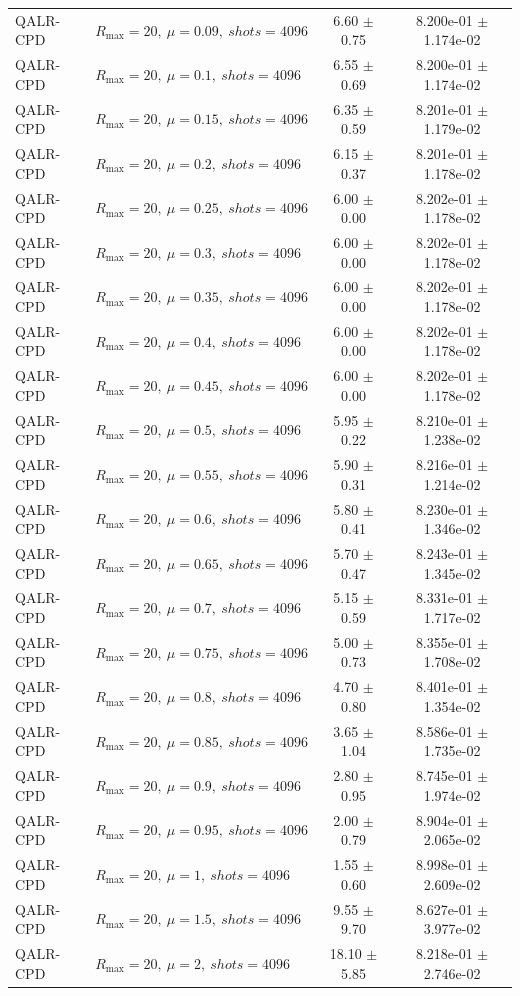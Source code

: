 \begin{table}[t]
\begin{tabular}{@{}llcc@{}}
QALR-CPD & \(R_{\max}=20,\ \mu=0.09,\ shots=4096\) & 6.60 $\pm$ 0.75 & 8.200e-01 $\pm$ 1.174e-02 \\
QALR-CPD & \(R_{\max}=20,\ \mu=0.1,\ shots=4096\) & 6.55 $\pm$ 0.69 & 8.200e-01 $\pm$ 1.174e-02 \\
QALR-CPD & \(R_{\max}=20,\ \mu=0.15,\ shots=4096\) & 6.35 $\pm$ 0.59 & 8.201e-01 $\pm$ 1.179e-02 \\
QALR-CPD & \(R_{\max}=20,\ \mu=0.2,\ shots=4096\) & 6.15 $\pm$ 0.37 & 8.201e-01 $\pm$ 1.178e-02 \\
QALR-CPD & \(R_{\max}=20,\ \mu=0.25,\ shots=4096\) & 6.00 $\pm$ 0.00 & 8.202e-01 $\pm$ 1.178e-02 \\
QALR-CPD & \(R_{\max}=20,\ \mu=0.3,\ shots=4096\) & 6.00 $\pm$ 0.00 & 8.202e-01 $\pm$ 1.178e-02 \\
QALR-CPD & \(R_{\max}=20,\ \mu=0.35,\ shots=4096\) & 6.00 $\pm$ 0.00 & 8.202e-01 $\pm$ 1.178e-02 \\
QALR-CPD & \(R_{\max}=20,\ \mu=0.4,\ shots=4096\) & 6.00 $\pm$ 0.00 & 8.202e-01 $\pm$ 1.178e-02 \\
QALR-CPD & \(R_{\max}=20,\ \mu=0.45,\ shots=4096\) & 6.00 $\pm$ 0.00 & 8.202e-01 $\pm$ 1.178e-02 \\
QALR-CPD & \(R_{\max}=20,\ \mu=0.5,\ shots=4096\) & 5.95 $\pm$ 0.22 & 8.210e-01 $\pm$ 1.238e-02 \\
QALR-CPD & \(R_{\max}=20,\ \mu=0.55,\ shots=4096\) & 5.90 $\pm$ 0.31 & 8.216e-01 $\pm$ 1.214e-02 \\
QALR-CPD & \(R_{\max}=20,\ \mu=0.6,\ shots=4096\) & 5.80 $\pm$ 0.41 & 8.230e-01 $\pm$ 1.346e-02 \\
QALR-CPD & \(R_{\max}=20,\ \mu=0.65,\ shots=4096\) & 5.70 $\pm$ 0.47 & 8.243e-01 $\pm$ 1.345e-02 \\
QALR-CPD & \(R_{\max}=20,\ \mu=0.7,\ shots=4096\) & 5.15 $\pm$ 0.59 & 8.331e-01 $\pm$ 1.717e-02 \\
QALR-CPD & \(R_{\max}=20,\ \mu=0.75,\ shots=4096\) & 5.00 $\pm$ 0.73 & 8.355e-01 $\pm$ 1.708e-02 \\
QALR-CPD & \(R_{\max}=20,\ \mu=0.8,\ shots=4096\) & 4.70 $\pm$ 0.80 & 8.401e-01 $\pm$ 1.354e-02 \\
QALR-CPD & \(R_{\max}=20,\ \mu=0.85,\ shots=4096\) & 3.65 $\pm$ 1.04 & 8.586e-01 $\pm$ 1.735e-02 \\
QALR-CPD & \(R_{\max}=20,\ \mu=0.9,\ shots=4096\) & 2.80 $\pm$ 0.95 & 8.745e-01 $\pm$ 1.974e-02 \\
QALR-CPD & \(R_{\max}=20,\ \mu=0.95,\ shots=4096\) & 2.00 $\pm$ 0.79 & 8.904e-01 $\pm$ 2.065e-02 \\
QALR-CPD & \(R_{\max}=20,\ \mu=1,\ shots=4096\) & 1.55 $\pm$ 0.60 & 8.998e-01 $\pm$ 2.609e-02 \\
QALR-CPD & \(R_{\max}=20,\ \mu=1.5,\ shots=4096\) & 9.55 $\pm$ 9.70 & 8.627e-01 $\pm$ 3.977e-02 \\
QALR-CPD & \(R_{\max}=20,\ \mu=2,\ shots=4096\) & 18.10 $\pm$ 5.85 & 8.218e-01 $\pm$ 2.746e-02 \\
\bottomrule
\end{tabular}
\end{table}